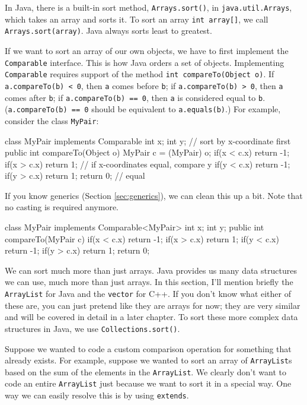 In Java, there is a built-in sort method, \texttt{Arrays.sort()}, in \texttt{java.util.Arrays}, which takes an array and sorts it. To sort an array \texttt{int array[]}, we call \texttt{Arrays.sort(array)}. Java always sorts least to greatest.

If we want to sort an array of our own objects, we have to first implement the \texttt{Comparable} interface. This is how Java orders a set of objects. Implementing \texttt{Comparable} requires support of the method \texttt{int compareTo(Object o)}. If \texttt{a.compareTo(b) < 0}, then \texttt{a} comes before \texttt{b}; if \texttt{a.compareTo(b) > 0}, then \texttt{a} comes after \texttt{b}; if \texttt{a.compareTo(b) == 0}, then \texttt{a} is considered equal to \texttt{b}. (\texttt{a.compareTo(b) == 0} should be equivalent to \texttt{a.equals(b)}.) For example, consider the class \texttt{MyPair}:

\begin{mylstlisting}
class MyPair implements Comparable {
	int x;
	int y;
    // sort by x-coordinate first
	public int compareTo(Object o) {
		MyPair c = (MyPair) o;
		if(x < c.x) return -1;
		if(x > c.x) return 1;
		// if x-coordinates equal, compare y
		if(y < c.x) return -1;
		if(y > c.x) return 1;
		return 0; // equal
	}
}
\end{mylstlisting}

If you know generics (Section \ref{sec:generics}), we can clean this up a bit. Note that no casting is required anymore.

\begin{mylstlisting}
class MyPair implements Comparable<MyPair> {
	int x;
	int y;
	public int compareTo(MyPair c) {
		if(x < c.x) return -1;
		if(x > c.x) return 1;
		if(y < c.x) return -1;
		if(y > c.x) return 1;
		return 0;
	}
}
\end{mylstlisting}

We can sort much more than just arrays. Java provides us many data structures we can use, much more than just arrays. In this section, I'll mention briefly the \texttt{ArrayList} for Java and the \texttt{vector} for C++. If you don't know what either of these are, you can just pretend like they are arrays for now; they are very similar and will be covered in detail in a later chapter. To sort these more complex data structures in Java, we use \texttt{Collections.sort()}.

Suppose we wanted to code a custom comparison operation for something that already exists. For example, suppose we wanted to sort an array of \texttt{ArrayList}s based on the sum of the elements in the \texttt{ArrayList}. We clearly don't want to code an entire \texttt{ArrayList} just because we want to sort it in a special way. One way we can easily resolve this is by using \texttt{extends}.

